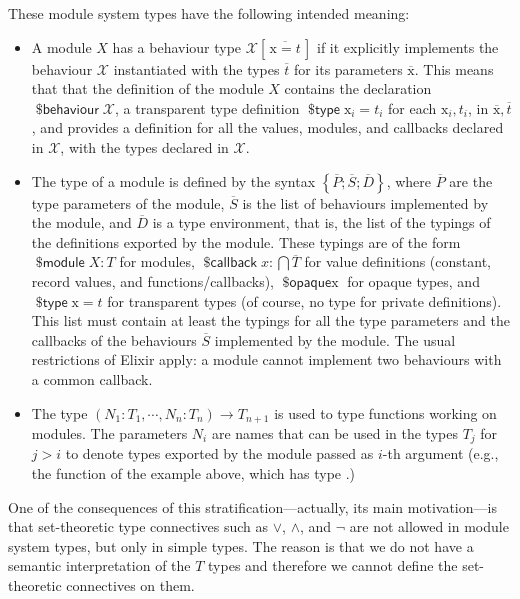\documentclass[a4paper,10pt]{article}
\DeclareMathOperator{\kwbvr}{\textsf{\$behaviour}}
\DeclareMathOperator{\kwopq}{\textsf{\$opaque}}
\DeclareMathOperator{\kwtp}{\textsf{\$type}}
\DeclareMathOperator{\kwmdl}{\textsf{\$module}}
\DeclareMathOperator{\kwclbk}{\textsf{\$callback}}
\newcommand{\tx}{\textrm{x}}
\begin{document}
  These module system types have the following intended meaning:
  \begin{itemize}
    \item A module $X$ has a behaviour type $\mathcal X[\,\overline{\tx= t}\,]$ if it explicitly implements the behaviour $\mathcal X$ instantiated with the types $\overline{t}$ for its parameters $\overline{\tx}$. This means that that the definition of the module $X$ contains the declaration $\kwbvr \mathcal X$, a transparent type definition $\kwtp \tx_i=t_i$ for each  $\tx_i, t_i$, in $\overline{\tx}, \overline t$, and provides a definition for all the values, modules, and callbacks declared in $\mathcal X$, with the types declared in $\mathcal X$. 
    \item The type of a module is defined by the syntax $\left\{\overline{P};\overline{S};\overline{D}\right\}$, where $\overline{P}$ are the type parameters of the module, $\overline{S}$ is the list of behaviours implemented by the module, and $\overline{D}$ is a type environment, that is, the list of the typings of the definitions exported by the module. These typings are of the form $\kwmdl X : T$ for modules, $\kwclbk x : \bigcap \overline{T}$ for value definitions (constant, record values, and functions/callbacks), $\kwopq \tx$ for opaque types, and $\kwtp \tx = t$ for transparent types (of course, no type for private definitions). This list must contain at least the typings for all the type parameters and the callbacks of the behaviours $\overline{S}$ implemented by the module. The usual restrictions of Elixir apply: a module cannot implement two  behaviours with a common callback. 
    \item The type $(N_1{:} T_1,\cdots, N_n{:}T_n) \to T_{n+1}$ is used to type functions working on modules. The parameters $N_i$ are names that can be used in the types $T_j$ for $j>i$ to denote types exported by the module passed as $i$-th argument (e.g., the  function of the  example above, which has type .)
\end{itemize}

  One of the consequences of this stratification---actually, its main motivation---is that set-theoretic type connectives such as $\vee$, $\wedge$, and $\neg$ are not allowed in module system types, but only in simple types. The reason is that we do not have a semantic interpretation of the $T$ types and therefore we cannot define the set-theoretic connectives on them.
\end{document}

